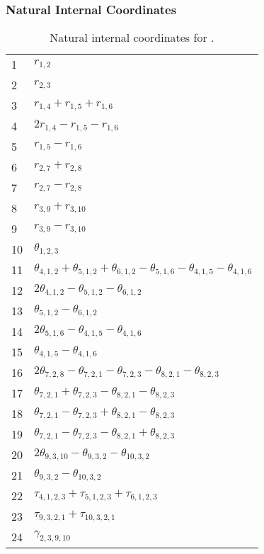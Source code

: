 \documentclass[10pt,oneside]{article}
\begin{document}
\begin{table}[h!]
\subsubsection*{Natural Internal Coordinates}
\centering
\caption{Natural internal coordinates for .}
\small
\begin{tabular}{ll}
\toprule
  1   & $r_{1,2}$ \\
  2   & $r_{2,3}$ \\
  3   & $r_{1,4} + r_{1,5} + r_{1,6}$ \\
  4   & $2r_{1,4} - r_{1,5} - r_{1,6}$ \\
  5   & $r_{1,5} - r_{1,6}$ \\
  6   & $r_{2,7} + r_{2,8}$ \\
  7   & $r_{2,7} - r_{2,8}$ \\
  8   & $r_{3,9} + r_{3,10}$ \\
  9   & $r_{3,9} - r_{3,10}$ \\
  10  & $\theta_{1,2,3}$ \\
  11  & $\theta_{4,1,2} + \theta_{5,1,2} + \theta_{6,1,2} - \theta_{5,1,6} - \theta_{4,1,5} - \theta_{4,1,6}$ \\
  12  & $2\theta_{4,1,2} - \theta_{5,1,2} - \theta_{6,1,2}$ \\
  13  & $\theta_{5,1,2} - \theta_{6,1,2}$ \\
  14  & $2\theta_{5,1,6} - \theta_{4,1,5} - \theta_{4,1,6}$ \\
  15  & $\theta_{4,1,5} - \theta_{4,1,6}$ \\
  16  & $2\theta_{7,2,8} - \theta_{7,2,1} - \theta_{7,2,3} - \theta_{8,2,1} - \theta_{8,2,3}$ \\
  17  & $\theta_{7,2,1} + \theta_{7,2,3} - \theta_{8,2,1} - \theta_{8,2,3}$ \\
  18  & $\theta_{7,2,1} - \theta_{7,2,3} + \theta_{8,2,1} - \theta_{8,2,3}$ \\
  19  & $\theta_{7,2,1} - \theta_{7,2,3} - \theta_{8,2,1} + \theta_{8,2,3}$ \\
  20  & $2\theta_{9,3,10} - \theta_{9,3,2} - \theta_{10,3,2}$ \\
  21  & $\theta_{9,3,2} - \theta_{10,3,2}$ \\
  22  & $\tau_{4,1,2,3} + \tau_{5,1,2,3} + \tau_{6,1,2,3}$ \\
  23  & $\tau_{9,3,2,1} + \tau_{10,3,2,1}$ \\
  24  & $\gamma_{2,3,9,10}$ \\
\bottomrule
\end{tabular}
\end{table}
\end{document}
